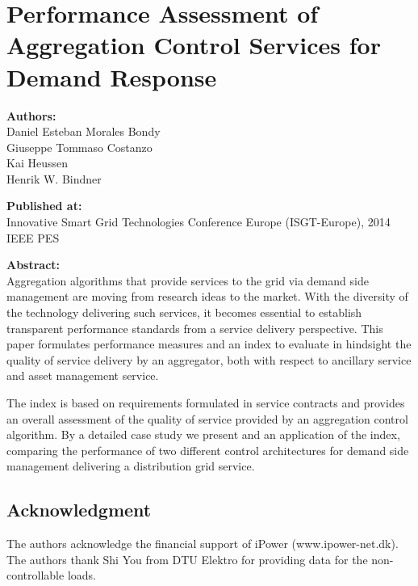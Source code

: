 \chapter{Performance Assessment of Aggregation Control Services for Demand Response}\label{app:isgt2014}

\textbf{Authors:}\\
Daniel Esteban Morales Bondy\\
Giuseppe Tommaso Costanzo\\
Kai Heussen\\
Henrik W. Bindner

\noindent
\textbf{Published at:}\\
Innovative Smart Grid Technologies Conference Europe (ISGT-Europe), 2014 IEEE PES

\noindent
\textbf{Abstract:}\\
Aggregation algorithms that provide services to the grid via demand side management are moving from research ideas to the market. With the diversity of the technology delivering such services, it becomes essential to establish transparent performance standards from a service delivery perspective. This paper formulates performance measures and an index to evaluate in hindsight the quality of service delivery by an aggregator, both with respect to ancillary service and asset management service.


The index is based on requirements formulated in service contracts and provides an overall assessment of the quality of service provided by an aggregation control algorithm. By a detailed case study we present and an application of the index, comparing the performance of two different control architectures for demand side management delivering a distribution grid service.





\section*{Acknowledgment}

The authors acknowledge the financial support of iPower (www.ipower-net.dk).
The authors thank Shi You from DTU Elektro for providing data for the non-controllable loads.


